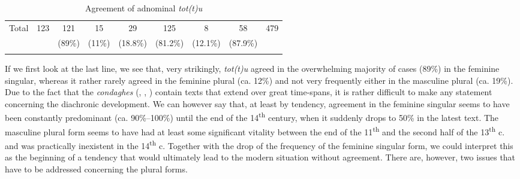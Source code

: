 \documentclass[output=paper,colorlinks,citecolor=brown]{langscibook}
\begin{document}
\begin{table}
\begin{tabularx}{\textwidth}{Qcccccccc}
\midrule

{Total}  & {123}   &  {121}  &  {15}  &  {29}  & {125}   &  {8}  & {58}   &  {479}\\
  &  & (89\%) & (11\%) & (18.8\%) & (81.2\%) & (12.1\%) & (87.9\%) & \\
\lspbottomrule
    \end{tabularx}
    \caption{Agreement of adnominal  \textit{tot(t)u}}
    \label{tab:men5}
\end{table}



If we first look at the last line, we see that, very strikingly, \textit{tot(t)u} agreed in the overwhelming majority of cases (89\%) in the feminine singular, whereas it rather rarely agreed in the feminine plural (ca. 12\%) and not very frequently either in the masculine plural (ca. 19\%). Due to the fact that the \textit{condaghes} (, , ) contain texts that extend over great time-spans, it is rather difficult to make any statement concerning the diachronic development. We can however say that, at least by tendency, agreement in the feminine singular seems to have been constantly predominant (ca. 90\%--100\%) until the end of the 14\textsuperscript{th} century, when it suddenly drops to 50\% in the latest text. The masculine plural form seems to have had at least some significant vitality between the end of the 11\textsuperscript{th} and the second half of the 13\textsuperscript{th} c. and was practically inexistent in the 14\textsuperscript{th} c. Together with the drop of the frequency of the feminine singular form, we could interpret this as the beginning of a tendency that would ultimately lead to the modern situation without agreement. There are, however, two issues that have to be addressed concerning the plural forms.
\end{document}
